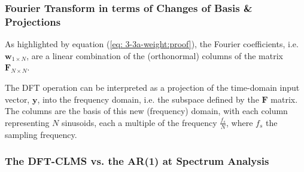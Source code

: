 \documentclass[12pt]{article}
\numberwithin{equation}{section}
\def\vy{{\bm{y}}}
\def\vw{{\bm{w}}}
\def\mF{{\bm{F}}}
\begin{document}
					
		\subsubsection{Fourier Transform in terms of Changes of Basis \& Projections}
			As highlighted by equation (\ref{eq: 3-3a-weight:proof}), the Fourier coefficients, i.e. $\vw_{1\times N}$, are a linear combination of the (orthonormal) columns of the matrix $\mF_{N\times N}$.
			
			The DFT operation can be interpreted as a projection of the time-domain input vector, $\vy$, into the frequency domain, i.e. the subspace defined by the $\mF$ matrix. The columns are the basis of this new (frequency) domain, with each column representing $N$ sinusoids, each a multiple of the frequency $\frac{f_{s}}{N}$, where $f_{s}$ the sampling frequency.
			
		\subsubsection{The DFT-CLMS vs. the AR(1) at Spectrum Analysis}
		
\end{document}
